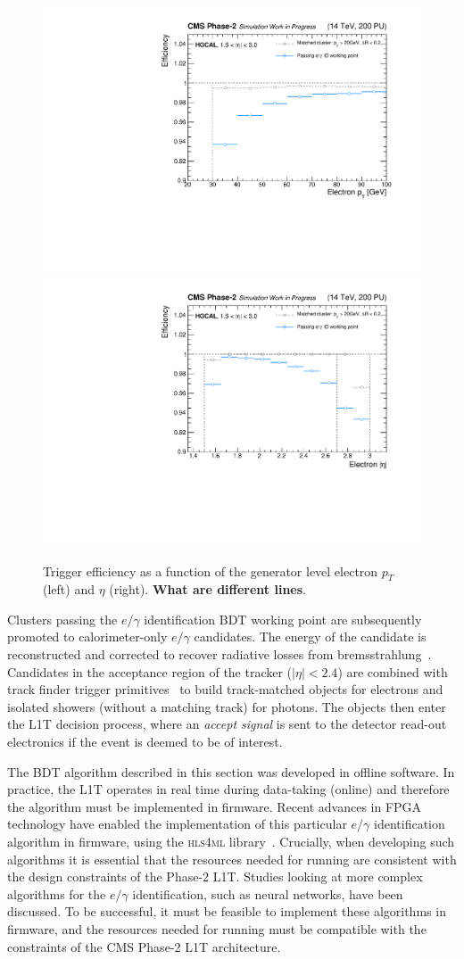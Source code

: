 \begin{figure}[htb!]
  \centering
  \includegraphics[width=.49\textwidth]{Figures/cms/egid/eff_vs_cl3d_gen_pt.pdf}
  \includegraphics[width=.49\textwidth]{Figures/cms/egid/eff_vs_cl3d_gen_eta.pdf}
  \caption[Efficiency of the $e/\gamma$ identification as a function of electron $p_T$ and $\eta$.]
  {
    Trigger efficiency as a function of the generator level electron $p_T$ (left) and $\eta$ (right). \textbf{What are different lines}.
  }
  \label{fig:egid_efficiency}
\end{figure}

Clusters passing the $e/\gamma$ identification BDT working point are subsequently promoted to calorimeter-only $e/\gamma$ candidates. The energy of the candidate is reconstructed and corrected to recover radiative losses from bremsstrahlung~\cite{}. Candidates in the acceptance region of the tracker ($|\eta|<2.4$) are combined with track finder trigger primitives~\cite{} to build track-matched objects for electrons and isolated showers (without a matching track) for photons. The objects then enter the L1T decision process, where an \textit{accept signal} is sent to the detector read-out electronics if the event is deemed to be of interest.

The BDT algorithm described in this section was developed in offline software. In practice, the L1T operates in real time during data-taking (online) and therefore the algorithm must be implemented in firmware. Recent advances in FPGA technology have enabled the implementation of this particular $e/\gamma$ identification algorithm in firmware, using the \textsc{hls4ml} library~\cite{Duarte_2018}. Crucially, when developing such algorithms it is essential that the resources needed for running are consistent with the design constraints of the Phase-2 L1T. Studies looking at more complex algorithms for the $e/\gamma$ identification, such as neural networks, have been discussed. To be successful, it must be feasible to implement these algorithms in firmware, and the resources needed for running must be compatible with the constraints of the CMS Phase-2 L1T architecture.

